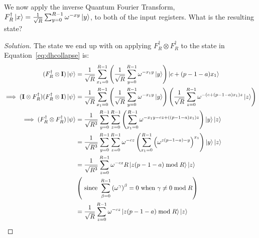 \begin{solution}[label=ques:4d]
  \begin{question}
    We now apply the inverse Quantum Fourier Transform, $F_R^\dagger\ket{x}=\frac{1}{\sqrt{R}} \sum_{y=0}^{R-1} \omega^{-xy}\ket{y}$, to both of the input registers. What is the resulting state?
  \end{question}
  \tcblower{}
  \begin{proof}[Solution]
    The state we end up with on applying $F_R^\dagger\otimes F_R^\dagger$ to the state in Equation~\ref{eq:dhcollapse} is:
    \begin{equation}
      \begin{split}
        (F_R^\dagger\otimes \mathbf{I})\ket{\psi} &= \frac{1}{\sqrt{R}} \sum_{x_1 = 0}^{R - 1} \left(\frac{1}{\sqrt{R}}\sum_{y=0}^{R - 1}\omega^{-x_1y}\ket{y}\right)\ket{c + (p - 1 - a)x_1}\\
        \implies (\mathbf{I} \otimes F_R^\dagger)(F_R^\dagger\otimes \mathbf{I})\ket{\psi} &= \frac{1}{\sqrt{R}} \sum_{x_1 = 0}^{R - 1} \left(\frac{1}{\sqrt{R}}\sum_{y=0}^{R - 1}\omega^{-x_1y}\ket{y}\right)\left(\frac{1}{\sqrt{R}}\sum_{z=0}^{R - 1}\omega^{-(c + (p - 1 - a)x_1)z}\ket{z}\right)\\
        \implies (F_R^\dagger\otimes F_R^\dagger)\ket{\psi} &= \frac{1}{\sqrt{R^3}}\sum_{y=0}^{R - 1}\sum_{z=0}^{R - 1}\left(\sum_{x_1=0}^{R-1}\omega^{-x_1y - cz + ((p - 1 - a)x_1)z}\right)\ket{y}\ket{z}\\
        &= \frac{1}{\sqrt{R^3}}\sum_{y=0}^{R - 1}\sum_{z=0}^{R - 1}\omega^{-cz}\left(\sum_{x_1=0}^{R-1}{\left(\omega^{z(p-1-a)-y}\right)}^{x_1}\right)\ket{y}\ket{z}\\
        &= \frac{1}{\sqrt{R^3}}\sum_{z=0}^{R - 1}\omega^{-cz}R\ket{z(p - 1 - a)\bmod R}\ket{z}\\
        &\left(\text{ since }\sum_{\beta=0}^{R-1}{\left(\omega^\gamma\right)}^\beta = 0\text{ when }\gamma \neq 0 \bmod R\right)\\
        &= \frac{1}{\sqrt{R}}\sum_{z=0}^{R - 1}\omega^{-cz}\ket{z(p - 1 - a)\bmod R}\ket{z}
      \end{split}
      \label{eq:dhqft}
    \end{equation}
  \end{proof}
\end{solution}

